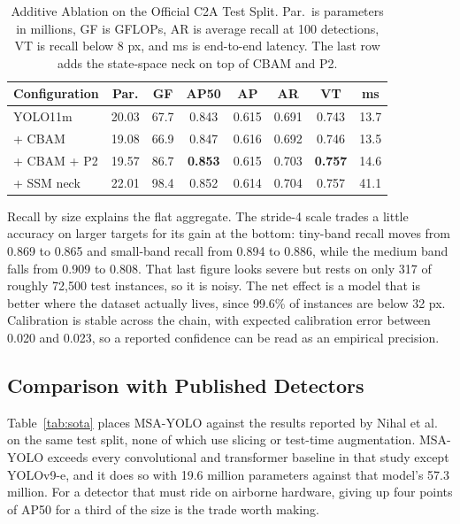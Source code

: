 \documentclass[conference,a4paper]{IEEEtran}
\begin{document}
\begin{table}[htbp]
\caption{Additive Ablation on the Official C2A Test Split. Par.\ is parameters
in millions, GF is GFLOPs, AR is average recall at 100 detections, VT is recall
below 8 px, and ms is end-to-end latency. The last row adds the state-space
neck on top of CBAM and P2.}
\label{tab:abl}
\begin{center}
\footnotesize
\setlength{\tabcolsep}{3pt}
\begin{tabular}{|l|c|c|c|c|c|c|c|}
\hline
\textbf{Configuration} & \textbf{Par.} & \textbf{GF} & \textbf{AP50} & \textbf{AP} & \textbf{AR} & \textbf{VT} & \textbf{ms} \\
\hline
YOLO11m & 20.03 & 67.7 & 0.843 & 0.615 & 0.691 & 0.743 & 13.7 \\
\hline
+ CBAM & 19.08 & 66.9 & 0.847 & 0.616 & 0.692 & 0.746 & 13.5 \\
\hline
+ CBAM + P2 & 19.57 & 86.7 & \textbf{0.853} & 0.615 & 0.703 & \textbf{0.757} & 14.6 \\
\hline
+ SSM neck & 22.01 & 98.4 & 0.852 & 0.614 & 0.704 & 0.757 & 41.1 \\
\hline
\end{tabular}
\end{center}
\end{table}

Recall by size explains the flat aggregate. The stride-4 scale trades a little
accuracy on larger targets for its gain at the bottom: tiny-band recall moves
from 0.869 to 0.865 and small-band recall from 0.894 to 0.886, while the medium
band falls from 0.909 to 0.808. That last figure looks severe but rests on only
317 of roughly 72{,}500 test instances, so it is noisy. The net effect is a
model that is better where the dataset actually lives, since 99.6\% of instances
are below 32 px. Calibration is stable across the chain, with expected
calibration error between 0.020 and 0.023, so a reported confidence can be read
as an empirical precision.

\subsection{Comparison with Published Detectors}
Table~\ref{tab:sota} places MSA-YOLO against the results reported by Nihal et
al.~\cite{nihal2024c2a} on the same test split, none of which use slicing or
test-time augmentation. MSA-YOLO exceeds every convolutional and transformer
baseline in that study except YOLOv9-e, and it does so with 19.6 million
parameters against that model's 57.3 million. For a detector that must ride on
airborne hardware, giving up four points of AP50 for a third of the size is the
trade worth making.
\end{document}
